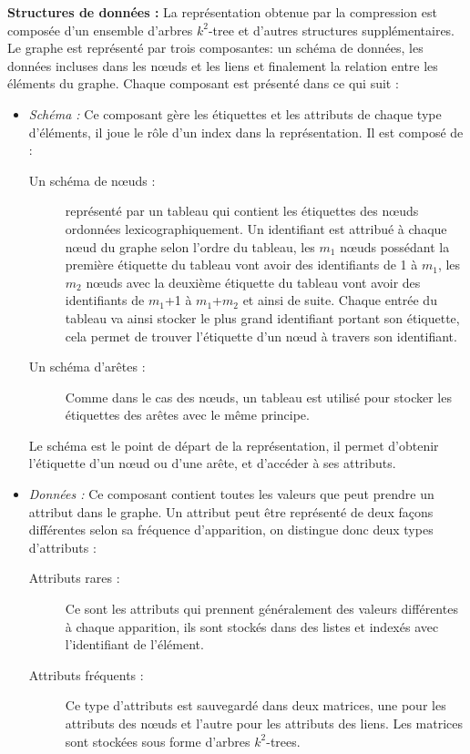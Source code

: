 \textbf{Structures de données :} La représentation obtenue par la compression est composée d'un ensemble d'arbres $k^2$-tree et d'autres structures supplémentaires. Le graphe est représenté par trois composantes: un schéma de données, les données incluses dans les nœuds et les liens et finalement la relation entre les éléments du graphe. Chaque composant est présenté dans ce qui suit :
\begin{itemize}
\item \textit{Schéma : } Ce composant gère les étiquettes et les attributs de chaque type d'éléments, il joue le rôle d'un index dans la représentation. Il est composé de :
\begin{description}
\item[Un schéma de nœuds :] représenté par un tableau qui contient les étiquettes des nœuds ordonnées lexicographiquement. Un identifiant est attribué à chaque nœud du graphe selon l'ordre du tableau, les \textit{$m_1$} nœuds possédant la première étiquette du tableau vont avoir des identifiants de 1 à \textit{$m_1$}, les \textit{$m_2$} nœuds avec la deuxième étiquette du tableau vont avoir des identifiants de \textit{$m_1$}+1 à \textit{$m_1$}+\textit{$m_2$} et ainsi de suite. Chaque entrée du tableau va ainsi stocker le plus grand identifiant portant son étiquette, cela permet de trouver l'étiquette d'un nœud à travers son identifiant.
\item[Un schéma d'arêtes :] Comme dans le cas des nœuds, un tableau est utilisé pour stocker les étiquettes des arêtes avec le même principe.  
\end{description}
Le schéma est le point de départ de la représentation, il permet d'obtenir l'étiquette d'un nœud ou d'une arête, et d'accéder à ses attributs.
\item \textit{Données :} Ce composant contient toutes les valeurs que peut prendre un attribut dans le graphe. Un attribut peut être représenté de deux façons différentes selon sa fréquence d'apparition, on distingue donc deux types d'attributs :
\begin{description}
\item[Attributs rares :] Ce sont les attributs qui prennent généralement des valeurs différentes à chaque apparition, ils sont stockés dans des listes et indexés avec l'identifiant de l'élément.
\item[Attributs fréquents :] Ce type d'attributs est sauvegardé dans deux matrices, une pour les attributs des nœuds et l'autre pour les attributs des liens. Les matrices sont stockées sous forme d'arbres $k^2$-trees.

\end{description}
\end{itemize}
